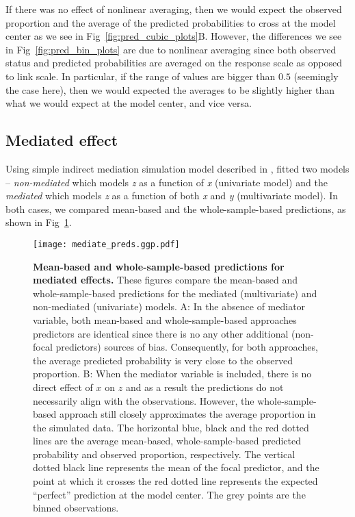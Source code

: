 If there was no effect of nonlinear averaging, then we would expect the observed proportion and the average of the predicted probabilities to cross at the model center as we see in Fig~\ref{fig:pred_cubic_plots}B. However, the differences we see in Fig~\ref{fig:pred_bin_plots} are due to nonlinear averaging since both observed status and predicted probabilities are averaged on the response scale as opposed to link scale. In particular, if the range of values are bigger than $0.5$ (seemingly the case here), then we would expected the averages to be slightly higher than what we would expect at the model center, and vice versa.

\subsection{Mediated effect}

Using simple indirect mediation simulation model described in , fitted two models -- \emph{non-mediated} which models \emph{z} as a function of \emph{x} (univariate model) and the \emph{mediated} which models \emph{z} as a function of both \emph{x} and \emph{y} (multivariate model). In both cases, we compared mean-based and the whole-sample-based predictions, as shown in Fig~\ref{fig:pred_mediated_plots}.

\begin{figure}[h]
\begin{center}
\texttt{[image: mediate\_preds.ggp.pdf]}
\end{center}
\caption{{\bf Mean-based and whole-sample-based predictions for mediated effects.} These figures compare the mean-based and whole-sample-based predictions for the mediated (multivariate) and non-mediated (univariate) models. A: In the absence of mediator variable, both mean-based and whole-sample-based approaches predictors are identical since there is no any other additional (non-focal predictors) sources of bias. Consequently, for both approaches, the average predicted probability is very close to the observed proportion. B: When the mediator variable is included, there is no direct effect of $x$ on $z$ and as a result the predictions do not necessarily align with the observations. However, the whole-sample-based approach still closely approximates the average proportion in the simulated data. The horizontal blue, black and the red dotted lines are the average mean-based, whole-sample-based predicted probability and observed proportion, respectively. The vertical dotted black line represents the mean of the focal predictor, and the point at which it crosses the red dotted line represents the expected ``perfect'' prediction at the model center. The grey points are the binned observations.}
\label{fig:pred_mediated_plots}
\end{figure}

